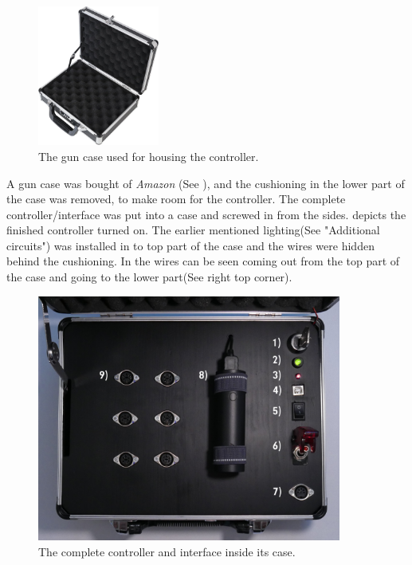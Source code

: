 \pagebreak

\begin{figure}[!ht]
    \centering
    \includegraphics[width=4cm]{./Figures/gn_case.jpg}
    \caption{ The gun case used for housing the controller. }
    \label{fig:gn_case}     
\end{figure}


\noindent A gun case was bought of \textit{Amazon} (See ), and the cushioning in the lower part of the case was removed, to make room for the controller. The complete controller/interface was put into a case and screwed in from the sides.  depicts the finished controller turned on. The earlier mentioned lighting(See  "Additional circuits") was installed in to top part of the case and the wires were hidden behind the cushioning. In  the wires can be seen coming out from the top part of the case and going to the lower part(See  right top corner).


\begin{figure}[!ht]
    \centering
    \includegraphics[width=10cm]{./Figures/controller_open_legend.png}
    \caption{ The complete controller and interface inside its case. }
    \label{fig:controller_open}     
\end{figure}

